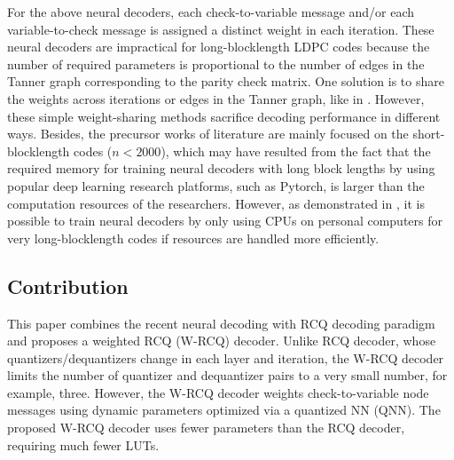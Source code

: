 \documentclass [PhD] {uclathes}
\begin{document}
For the above neural decoders, each check-to-variable message and/or each variable-to-check message is assigned a distinct weight in each iteration.
These neural decoders are impractical for long-blocklength LDPC codes because the number of required parameters is proportional to the number of edges in the Tanner graph corresponding to the parity check matrix.  
One solution is to share the weights across iterations or edges in the Tanner graph, like in \cite{Nachmani2017-qq,Wang2020-fb,Abotabl2019-wt, Lian2019-jh}. However, these simple weight-sharing methods sacrifice decoding performance in different ways.
Besides, the precursor works of literature are mainly focused on the short-blocklength codes ($n<2000$), which may have resulted from the fact that the required memory for training neural decoders with long block lengths by using popular deep learning research platforms, such as Pytorch, is larger than the computation resources of the researchers. 
However, as demonstrated in \cite{Abotabl2019-wt,wang2021ISTC}, it is possible to train neural decoders by only using CPUs on personal computers for very long-blocklength codes if resources are handled more efficiently. 

\subsection{Contribution}
This paper combines the recent neural decoding with RCQ decoding paradigm and proposes a weighted RCQ (W-RCQ) decoder. Unlike RCQ decoder, whose quantizers/dequantizers  change in each layer and iteration, the W-RCQ decoder limits the number of quantizer and dequantizer pairs to a very small number, for example, three. However, the W-RCQ decoder weights check-to-variable node messages using dynamic parameters optimized via a quantized NN (QNN). The proposed W-RCQ decoder uses fewer parameters than the RCQ decoder, requiring much fewer LUTs. 
\end{document}

